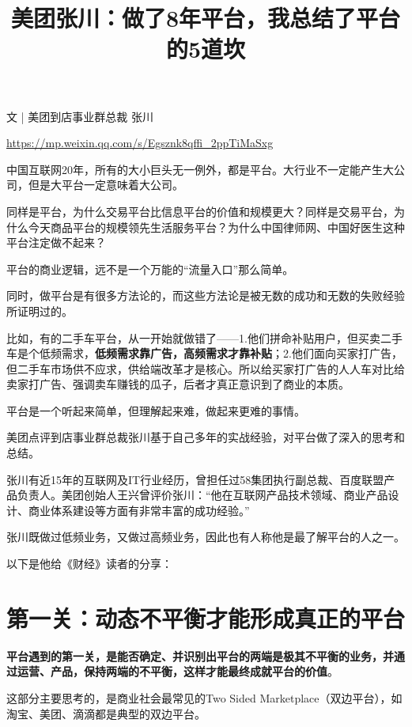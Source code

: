 \documentclass[12pt]{article}
\title{美团张川：做了8年平台，我总结了平台的5道坎}
\begin{document}
\maketitle
\tableofcontents

\begin{framed}
文 | 美团到店事业群总裁  张川

\url{https://mp.weixin.qq.com/s/Egsznk8qffi_2ppTiMaSxg}

中国互联网20年，所有的大小巨头无一例外，都是平台。大行业不一定能产生大公司，但是大平台一定意味着大公司。

同样是平台，为什么交易平台比信息平台的价值和规模更大？同样是交易平台，为什么今天商品平台的规模领先生活服务平台？为什么中国律师网、中国好医生这种平台注定做不起来？

平台的商业逻辑，远不是一个万能的“流量入口”那么简单。

同时，做平台是有很多方法论的，而这些方法论是被无数的成功和无数的失败经验所证明过的。

比如，有的二手车平台，从一开始就做错了——1.他们拼命补贴用户，但买卖二手车是个低频需求，\textbf{低频需求靠广告，高频需求才靠补贴}；2.他们面向买家打广告，但二手车市场供不应求，供给端改革才是核心。所以给买家打广告的人人车对比给卖家打广告、强调卖车赚钱的瓜子，后者才真正意识到了商业的本质。

平台是一个听起来简单，但理解起来难，做起来更难的事情。

美团点评到店事业群总裁张川基于自己多年的实战经验，对平台做了深入的思考和总结。

张川有近15年的互联网及IT行业经历，曾担任过58集团执行副总裁、百度联盟产品负责人。美团创始人王兴曾评价张川：“他在互联网产品技术领域、商业产品设计、商业体系建设等方面有非常丰富的成功经验。”

张川既做过低频业务，又做过高频业务，因此也有人称他是最了解平台的人之一。

以下是他给《财经》读者的分享：
\end{framed}

\section{第一关：动态不平衡才能形成真正的平台}

\textbf{平台遇到的第一关，是能否确定、并识别出平台的两端是极其不平衡的业务，并通过运营、产品，保持两端的不平衡，这样才能最终成就平台的价值}。

这部分主要思考的，是商业社会最常见的Two Sided Marketplace（双边平台），如淘宝、美团、滴滴都是典型的双边平台。
\end{document}
